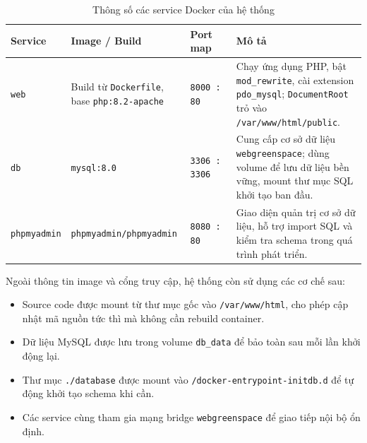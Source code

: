 \documentclass[11pt, a4paper]{article}
\begin{document}
\begin{table}[H]
    \centering
    \caption{Thông số các service Docker của hệ thống}
    \label{tab:docker-services}
    \begin{tabularx}{\linewidth}{|>{\raggedright\arraybackslash}p{2.5cm}
                                  |>{\raggedright\arraybackslash}p{3.5cm}
                                  |>{\centering\arraybackslash}p{2.2cm}
                                  |Y|}
        \hline
        \textbf{Service} & \textbf{Image / Build} & \textbf{Port map} & \textbf{Mô tả} \\ \hline
        \texttt{web} &
            Build từ \texttt{Dockerfile}, base \texttt{php:8.2-apache} &
            \texttt{8000\,:\,80} &
            Chạy ứng dụng PHP, bật \texttt{mod\_rewrite}, cài extension
            \texttt{pdo\_mysql}; \texttt{DocumentRoot} trỏ vào \texttt{/var/www/html/public}. \\ \hline
        \texttt{db} &
            \texttt{mysql:8.0} &
            \texttt{3306\,:\,3306} &
            Cung cấp cơ sở dữ liệu \texttt{webgreenspace}; dùng volume để lưu
            dữ liệu bền vững, mount thư mục SQL khởi tạo ban đầu. \\ \hline
        \texttt{phpmyadmin} &
            \texttt{phpmyadmin/\allowbreak phpmyadmin} &
            \texttt{8080\,:\,80} &
            Giao diện quản trị cơ sở dữ liệu, hỗ trợ import SQL và kiểm tra
            schema trong quá trình phát triển. \\ \hline
    \end{tabularx}
\end{table}

Ngoài thông tin image và cổng truy cập, hệ thống còn sử dụng các cơ chế sau:

\begin{itemize}[leftmargin=*]
    \item Source code được mount từ thư mục gốc vào \texttt{/var/www/html},
          cho phép cập nhật mã nguồn tức thì mà không cần rebuild container.
    \item Dữ liệu MySQL được lưu trong volume \texttt{db\_data} để bảo toàn
          sau mỗi lần khởi động lại.
    \item Thư mục \texttt{./database} được mount vào
          \texttt{/docker-entrypoint-initdb.d} để tự động khởi tạo schema khi cần.
    \item Các service cùng tham gia mạng bridge \texttt{webgreenspace} để
          giao tiếp nội bộ ổn định.
\end{itemize}
\end{document}
